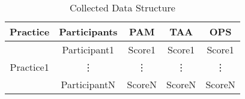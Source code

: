 \begin{table} [H]
	\begin{tabular}{| c | c | c | c | c |} \hline
	\textbf{Practice} & \textbf{Participants} & \textbf{PAM} & \textbf{TAA} & \textbf{OPS} \\ \hline
	\multirow{3}{*}{Practice1} & Participant1 & Score1 & Score1 & Score1 \\ \hhline{~----}
	& \vdots & \vdots & \vdots  & \vdots \\ \hhline{~----}
	& ParticipantN & ScoreN & ScoreN & ScoreN \\ \hline
	\end{tabular}
	\caption{Collected Data Structure}
	\label{table:data_structure}
\end{table}

\clearpage

